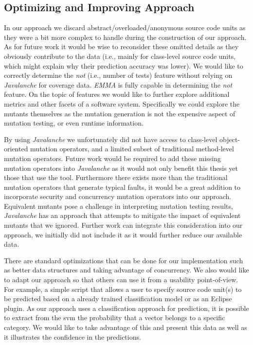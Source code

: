 \subsection{Optimizing and Improving Approach}
\label{subsec:conclusions_optimizing_approach}
In our approach we discard abstract/overloaded/anonymous source code units as they were a bit more complex to handle during the construction of our approach. As for future work it would be wise to reconsider these omitted details as they obviously contribute to the data (i.e., mainly for class-level source code units, which might explain why their prediction accuracy was lower). We would like to correctly determine the \emph{not} (i.e., number of tests) feature without relying on \emph{Javalanche} for coverage data. \emph{EMMA} is fully capable in determining the \emph{not} feature. On the topic of features we would like to further explore additional metrics and other facets of a software system. Specifically we could explore the mutants themselves as the mutation generation is not the expensive aspect of mutation testing, or even runtime information.

By using \emph{Javalanche} we unfortunately did not have access to class-level object-oriented mutation operators, and a limited subset of traditional method-level mutation operators. Future work would be required to add these missing mutation operators into \emph{Javalanche} as it would not only benefit this thesis yet those that use the tool. Furthermore there exists more than the traditional mutation operators that generate typical faults, it would be a great addition to incorporate security and concurrency mutation operators into our approach. Equivalent mutants pose a challenge in interpreting mutation testing results, \emph{Javalanche} has an approach that attempts to mitigate the impact of equivalent mutants that we ignored. Further work can integrate this consideration into our approach, we initially did not include it as it would further reduce our available data.

There are standard optimizations that can be done for our implementation such as better data structures and taking advantage of concurrency. We also would like to adapt our approach so that others can use it from a usability point-of-view. For example, a simple script that allows a user to specify source code unit(s) to be predicted based on a already trained classification model or as an Eclipse plugin. As our approach uses a classification approach for prediction, it is possible to extract from the \gls{svm} the probability that a vector belongs to a specific category. We would like to take advantage of this and present this data as well as it illustrates the confidence in the predictions.


